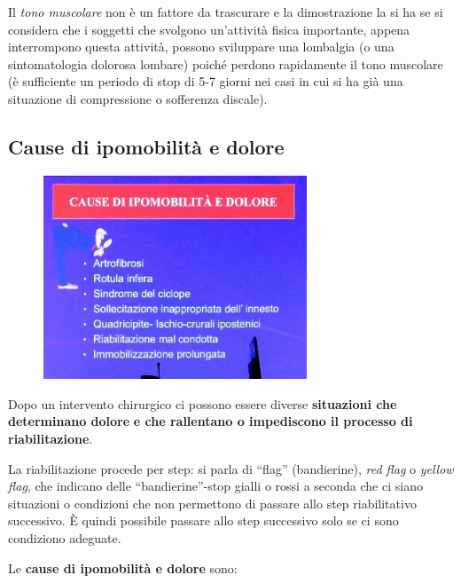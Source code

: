 Il \emph{tono muscolare} non è un fattore da trascurare e la
dimostrazione la si ha se si considera che i soggetti che svolgono
un'attività fisica importante, appena interrompono questa attività,
possono sviluppare una lombalgia (o una sintomatologia dolorosa lombare)
poiché perdono rapidamente il tono muscolare (è sufficiente un periodo
di stop di 5-7 giorni nei casi in cui si ha già una situazione di
compressione o sofferenza discale).

\subsection{Cause di ipomobilità e dolore}


\begin{figure}[!ht]
\centering
	\includegraphics[width=0.7\textwidth]{030/image2.jpeg}
\end{figure}

Dopo un intervento chirurgico ci possono essere diverse
\textbf{situazioni che determinano dolore} \textbf{e che rallentano o
impediscono il processo di riabilitazione}.

La riabilitazione procede per step: si parla di ``flag'' (bandierine),
\emph{red flag} o \emph{yellow flag}, che indicano delle
``bandierine''-stop gialli o rossi a seconda che ci siano situazioni o
condizioni che non permettono di passare allo step riabilitativo
successivo. È quindi possibile passare allo step successivo solo se ci
sono condiziono adeguate.

Le \textbf{cause di ipomobilità e dolore} sono:

